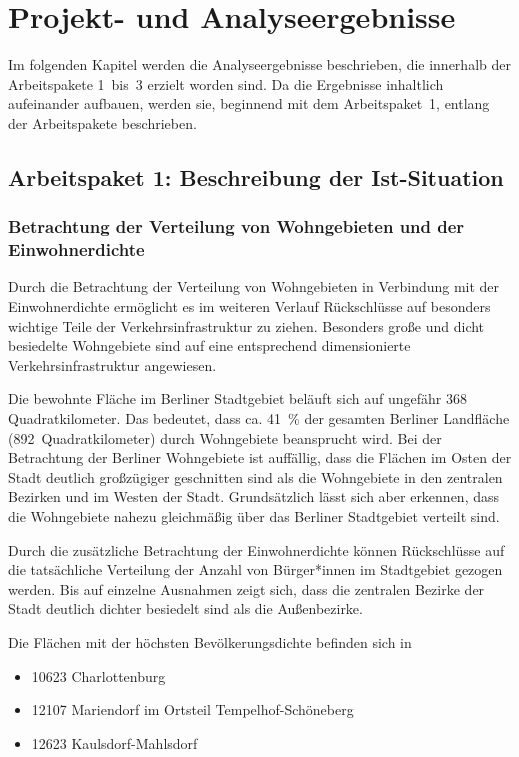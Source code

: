 \newpage
\section{Projekt-  und Analyseergebnisse}
\label{projekt_und_analyseergebnisse}

Im folgenden Kapitel werden die Analyseergebnisse beschrieben, die innerhalb der Arbeitspakete 1~bis~3 erzielt worden sind. Da die Ergebnisse inhaltlich aufeinander aufbauen, werden sie, beginnend mit dem Arbeitspaket~1, entlang der Arbeitspakete beschrieben.

\subsection{Arbeitspaket 1: Beschreibung der Ist-Situation}
\label{arbeitspaket_1_beschreibung_der_ist_situation}

\subsubsection{Betrachtung der Verteilung von Wohngebieten und der Einwohnerdichte}

Durch die Betrachtung der Verteilung von Wohngebieten in Verbindung mit der Einwohnerdichte ermöglicht es im weiteren Verlauf Rückschlüsse auf besonders wichtige Teile der Verkehrsinfrastruktur zu ziehen. Besonders große und dicht besiedelte Wohngebiete sind auf eine entsprechend dimensionierte Verkehrsinfrastruktur angewiesen.

Die bewohnte Fläche im Berliner Stadtgebiet beläuft sich auf ungefähr 368 Quadratkilometer. Das bedeutet, dass ca. 41~\% der gesamten Berliner Landfläche (892~Quadratkilometer) durch Wohngebiete beansprucht wird. Bei der Betrachtung der Berliner Wohngebiete ist auffällig, dass die Flächen im Osten der Stadt deutlich großzügiger geschnitten sind als die Wohngebiete in den zentralen Bezirken und im Westen der Stadt. Grundsätzlich lässt sich aber erkennen, dass die Wohngebiete nahezu gleichmäßig über das Berliner Stadtgebiet verteilt sind.

Durch die zusätzliche Betrachtung der Einwohnerdichte können Rückschlüsse auf die tatsächliche Verteilung der Anzahl von Bürger*innen im Stadtgebiet gezogen werden. Bis auf einzelne Ausnahmen zeigt sich, dass die zentralen Bezirke der Stadt deutlich dichter besiedelt sind als die Außenbezirke.

Die Flächen mit der höchsten Bevölkerungsdichte befinden sich in

\begin{itemize}
    \item 10623 Charlottenburg
    \item 12107 Mariendorf im Ortsteil Tempelhof-Schöneberg
    \item 12623 Kaulsdorf-Mahlsdorf
\end{itemize}

